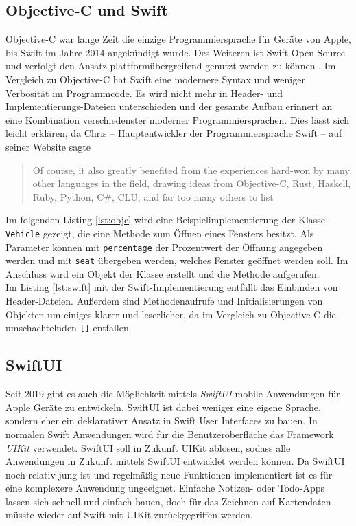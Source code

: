 \subsection{Objective-C und Swift}
Objective-C war lange Zeit die einzige Programmiersprache für Geräte von Apple, bis Swift im Jahre 2014 angekündigt wurde.
Des Weiteren ist Swift Open-Source und verfolgt den Ansatz plattformübergreifend genutzt werden zu können \parencite{APP2020}.
Im Vergleich zu Objective-C hat Swift eine modernere Syntax und weniger Verbosität im Programmcode.
Es wird nicht mehr in Header- und Implementierungs-Dateien unterschieden und der gesamte Aufbau erinnert an eine Kombination verschiedenster moderner Programmiersprachen.
Dies lässt sich leicht erklären, da Chris \textcite{LAT} – Hauptentwickler der Programmiersprache Swift – auf seiner Website sagte \blockquote{Of course, it also greatly benefited from the experiences hard-won by many other languages in the field, drawing ideas from Objective-C, Rust, Haskell, Ruby, Python, C\#, CLU, and far too many others to list}.
Im folgenden Listing \ref{lst:objc} wird eine Beispielimplementierung der Klasse \texttt{Vehicle} gezeigt, die eine Methode zum Öffnen eines Fensters besitzt.
Als Parameter können mit \texttt{percentage} der Prozentwert der Öffnung angegeben werden und mit \texttt{seat} übergeben werden, welches Fenster geöffnet werden soll.
Im Anschluss wird ein Objekt der Klasse erstellt und die Methode aufgerufen.
\\
Im Listing \ref{lst:swift} mit der Swift-Implementierung entfällt das Einbinden von Header-Dateien.%
%
Außerdem sind Methodenaufrufe und Initialisierungen von Objekten um einiges klarer und leserlicher, da im Vergleich zu Objective-C die umschachtelnden \texttt{[]} entfallen.

\subsection{SwiftUI}
Seit 2019 gibt es auch die Möglichkeit mittels \textit{SwiftUI} mobile Anwendungen für Apple Geräte zu entwickeln.
SwiftUI ist dabei weniger eine eigene Sprache, sondern eher ein deklarativer Ansatz in Swift User Interfaces zu bauen.
In normalen Swift Anwendungen wird für die Benutzeroberfläche das Framework \textit{UIKit} verwendet.
SwiftUI soll in Zukunft UIKit ablösen, sodass alle Anwendungen in Zukunft mittels SwiftUI entwicklet werden können.\pbreak%
%
Da SwiftUI noch relativ jung ist und regelmäßig neue Funktionen implementiert ist es für eine komplexere Anwendung ungeeignet.
Einfache Notizen- oder Todo-Apps lassen sich schnell und einfach bauen, doch für das Zeichnen auf Kartendaten müsste wieder auf Swift mit UIKit zurückgegriffen werden.

